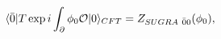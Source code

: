 \begin{equation} \label{ads cft}
\langle \bar{0} | T \exp i \int_\partial \phi_0 {\cal O} | 0 \rangle_{CFT} = Z_{SUGRA \ \bar{0} 0} (\phi_0) ,
\end{equation}

